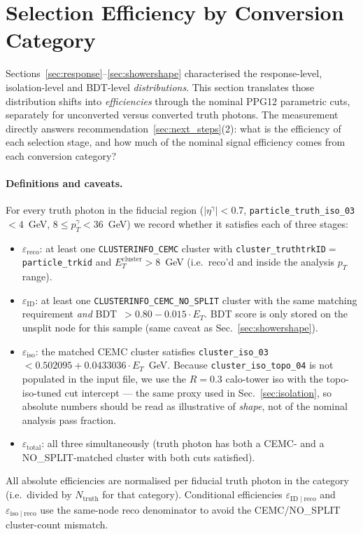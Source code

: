 \documentclass[11pt,a4paper]{article}
\begin{document}
\section{Selection Efficiency by Conversion Category}
\label{sec:efficiency}

Sections~\ref{sec:response}--\ref{sec:showershape} characterised the
response-level, isolation-level and BDT-level \emph{distributions}.
This section translates those distribution shifts into \emph{efficiencies}
through the nominal PPG12 parametric cuts, separately for unconverted
versus converted truth photons. The measurement directly answers
recommendation~\ref{sec:next_steps}(2): what is the efficiency of each
selection stage, and how much of the nominal signal efficiency comes from
each conversion category?

\paragraph{Definitions and caveats.}
For every truth photon in the fiducial region ($|\eta^{\gamma}|<0.7$,
\texttt{particle\_truth\_iso\_03} $<4$~GeV, $8 \le p_T^{\gamma} < 36$~GeV) we
record whether it satisfies each of three stages:
%
\begin{itemize}
  \item $\varepsilon_{\mathrm{reco}}$: at least one
  \texttt{CLUSTERINFO\_CEMC} cluster with
  \texttt{cluster\_truthtrkID}$={}$\texttt{particle\_trkid} and
  $E_T^{\mathrm{cluster}}>8$~GeV (i.e.\ reco'd and inside the analysis
  $p_T$ range).
  \item $\varepsilon_{\mathrm{ID}}$: at least one
  \texttt{CLUSTERINFO\_CEMC\_NO\_SPLIT} cluster with the same matching
  requirement \emph{and} \mbox{BDT $> 0.80-0.015\cdot E_T$}. BDT score is
  only stored on the unsplit node for this sample (same caveat as
  Sec.~\ref{sec:showershape}).
  \item $\varepsilon_{\mathrm{iso}}$: the matched CEMC cluster satisfies
  \texttt{cluster\_iso\_03} $<0.502095+0.0433036\cdot E_T$~GeV. Because
  \texttt{cluster\_iso\_topo\_04} is not populated in the input file, we
  use the $R=0.3$ calo-tower iso with the topo-iso-tuned cut intercept
  --- the same proxy used in Sec.~\ref{sec:isolation}, so absolute
  numbers should be read as illustrative of \emph{shape}, not of the
  nominal analysis pass fraction.
  \item $\varepsilon_{\mathrm{total}}$: all three simultaneously (truth
  photon has both a CEMC- and a NO\_SPLIT-matched cluster with both cuts
  satisfied).
\end{itemize}
%
All absolute efficiencies are normalised per fiducial truth photon in
the category (i.e.\ divided by $N_{\mathrm{truth}}$ for that category).
Conditional efficiencies $\varepsilon_{\mathrm{ID}\mid\mathrm{reco}}$
and $\varepsilon_{\mathrm{iso}\mid\mathrm{reco}}$ use the
same-node reco denominator to avoid the CEMC/NO\_SPLIT cluster-count
mismatch.
\end{document}
